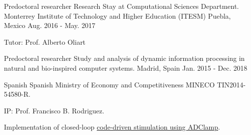 \begin{cventries}
  \cventry
    {Predoctoral researcher} %
    {Research Stay at Computational Sciences Department. Monterrey Institute of Technology and Higher Education (ITESM)} %
    {Puebla, Mexico} %
    {Aug. 2016 - May. 2017} %
    {
    \begin{cvitems}
     \item {Tutor: Prof. Alberto Oliart}
    \end{cvitems}
    }


  \cventry
    {Predoctoral researcher} %
    {Study and analysis of dynamic information processing in natural and bio-inspired computer systems.} %
    {Madrid, Spain} %
    {Jan. 2015 - Dec. 2018} %
    {
      \begin{cvitems} %
        \item {Spanish Spanish Ministry of Economy and Competitiveness MINECO TIN2014-54580-R.}
        \item {IP: Prof. Francisco B. Rodriguez.}
        \item {Implementation of closed-loop \underline{\href{http://arantxa.ii.uam.es/~gnb/material.htm}{code-driven stimulation using ADClamp}}.}
      \end{cvitems}
    }

\end{cventries}